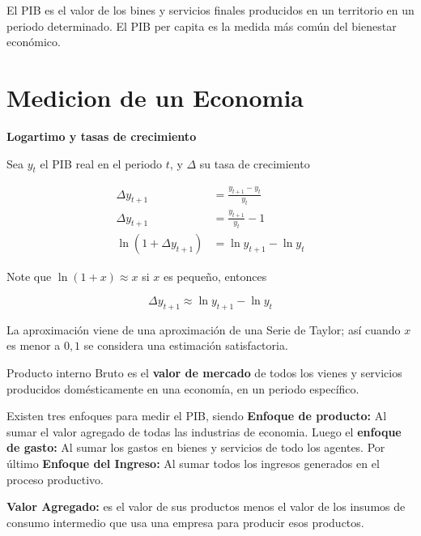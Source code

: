 
El PIB es el valor de los bines y servicios finales producidos en un territorio en un periodo determinado. El PIB per capita es la medida más común del bienestar económico. 

\section{Medicion de un Economia}

\textbf{Logartimo y tasas de crecimiento}

Sea $y_{t}$ el PIB real en el periodo $t$, y $\Delta$ su tasa de crecimiento

\begin{align*}
    \Delta y_{t+1} &= \frac{y_{t+1} - y_{t}}{y_{t}} \\
    \Delta y_{t+1} &= \frac{y_{t+1}}{y_{t}} - 1  \\
    \ln{(1+ \Delta y_{t+1})}  &= \ln{y_{t+1}} - \ln{y_{t}}
\end{align*}

Note que $\ln{(1+x)}\approx x$ si $x$ es pequeño, entonces

\begin{equation}
     \Delta y_{t+1}  \approx \ln{y_{t+1}} - \ln{y_{t}}
\end{equation}

La aproximación viene de una aproximación de una Serie de Taylor; así cuando $x$ es menor a $0,1$ se considera una estimación satisfactoria.

\begin{definition}
Producto interno Bruto es el \textbf{valor de mercado} de todos los vienes y servicios producidos domésticamente en una economía, en un periodo específico.
\end{definition}

Existen tres enfoques para medir el PIB, siendo \textbf{Enfoque de producto:} Al sumar el valor agregado de todas las industrias de economia. Luego el \textbf{enfoque de gasto:} Al sumar los gastos en bienes y servicios de todo los agentes. Por último \textbf{Enfoque del Ingreso:} Al sumar todos los ingresos generados en el proceso productivo.

\begin{definition}
\textbf{Valor Agregado:} es el valor de sus productos menos el valor de los insumos de consumo intermedio que usa una empresa para producir esos productos.
\end{definition}

